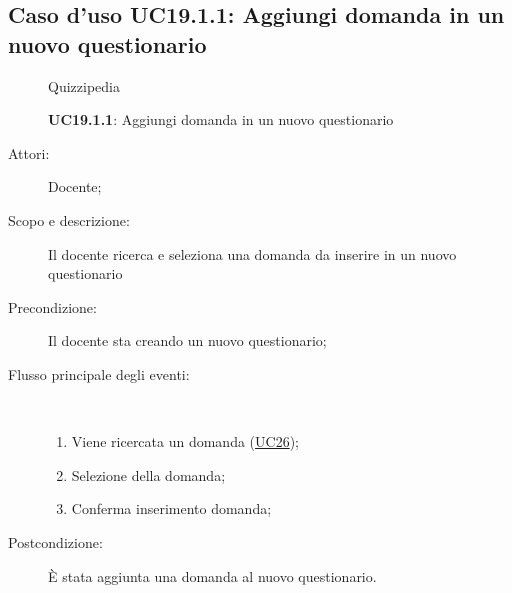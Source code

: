 \subsection{Caso d'uso UC19.1.1: Aggiungi domanda in un nuovo questionario }
	\begin{figure}[H]
		\centering
		\begin{resizedtikzpicture}{\textwidth}
		\begin{umlsystem}[x=0, fill=lightgray!20]{Quizzipedia}
		\end{umlsystem}
		\end{resizedtikzpicture}
		\caption{\textbf{UC19.1.1}: Aggiungi domanda in un nuovo questionario }
		\label{UC19.1.1}
	\end{figure}
\begin{description}
\item[Attori:] Docente;
\item[Scopo e descrizione:] Il docente ricerca e seleziona una domanda da inserire in un nuovo questionario
      \item[Precondizione:] Il docente sta creando un nuovo questionario;

        \item[Flusso principale degli eventi:] \ 
 \begin{enumerate}
          \item Viene ricercata un domanda (\hyperlink{UC26}{UC26});
          \item Selezione della domanda;
          \item Conferma inserimento domanda;

      \end{enumerate}
    \item[Postcondizione:] È stata aggiunta una domanda al nuovo questionario.
  \end{description}
\hypertarget{UC19.1.2}{}
